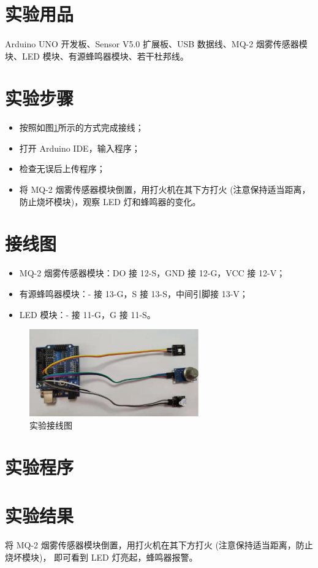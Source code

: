 \documentclass[UTF8, oneside]{ctexbook}
\begin{document}
\section{实验用品}
\paragraph{}
Arduino UNO 开发板、Sensor V5.0 扩展板、USB 数据线、MQ-2 烟雾传感器模块、LED 模块、有源蜂鸣器模块、若干杜邦线。

\section{实验步骤}
\begin{itemize}
    \item[(1)] 按照如图\ref{s24_line}所示的方式完成接线；
    \item[(2)] 打开 Arduino IDE，输入程序；
    \item[(3)] 检查无误后上传程序；
    \item[(4)] 将 MQ-2 烟雾传感器模块倒置，用打火机在其下方打火 (注意保持适当距离，防止烧坏模块)，观察 LED 灯和蜂鸣器的变化。
\end{itemize}

\section{接线图}
\begin{itemize}
    \item MQ-2 烟雾传感器模块：DO 接 12-S，GND 接 12-G，VCC 接 12-V；
    \item 有源蜂鸣器模块：- 接 13-G，S 接 13-S，中间引脚接 13-V；
    \item LED 模块：- 接 11-G，G 接 11-S。
\end{itemize}
\begin{figure}[h]
    \centering
    \includegraphics[width=0.65\textwidth]{./result/sensor/24/lines2.png}
    \caption{实验接线图}
    \label{s24_line}
\end{figure}

\section{实验程序}


\section{实验结果}
\paragraph{}
将 MQ-2 烟雾传感器模块倒置，用打火机在其下方打火 (注意保持适当距离，防止烧坏模块)，
即可看到 LED 灯亮起，蜂鸣器报警。
\end{document}
